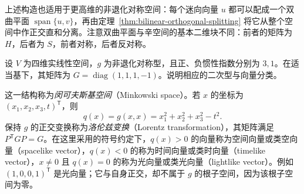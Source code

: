 上述构造也适用于更高维的非退化对称空间：每个迷向向量 $u$ 都可以配成一个双曲平面 $\operatorname{span}\{u,v\}$，再由定理~\ref{thm:bilinear-orthogonal-splitting} 将它从整个空间中作正交直和分离。注意双曲平面与辛空间的基本二维块不同：前者的矩阵为 $H$，后者为 $S$，前者对称，后者反对称。

\begin{example}
\label{ex:bilinear-minkowski-space}
设 $V$ 为四维实线性空间，$g$ 为非退化对称型，且正、负惯性指数分别为 $3,1$。在适当基下，其矩阵为 $G=\operatorname{diag}(1,1,1,-1)$。说明相应的二次型与向量分类。
\end{example}

\begin{solve}
这一结构称为\emph{闵可夫斯基空间}（Minkowski space）。若 $x$ 的坐标为 $(x_1,x_2,x_3,t)^{\mathsf T}$，则
\[
    q(x)=g(x,x)=x_1^2+x_2^2+x_3^2-t^2.
\]
保持 $g$ 的正交变换称为\emph{洛伦兹变换}（Lorentz transformation），其矩阵满足 $P^{\mathsf T}GP=G$。在这里采用的符号约定下，$q(x)>0$ 的向量称为空间向量或类空向量（spacelike vector），$q(x)<0$ 的称为时间向量或类时向量（timelike vector），$x\neq0$ 且 $q(x)=0$ 的称为光向量或类光向量（lightlike vector）。例如 $(1,0,0,1)^{\mathsf T}$ 是光向量；它与自身正交，却不属于 $g$ 的根子空间，因为该根子空间为零。
\end{solve}





